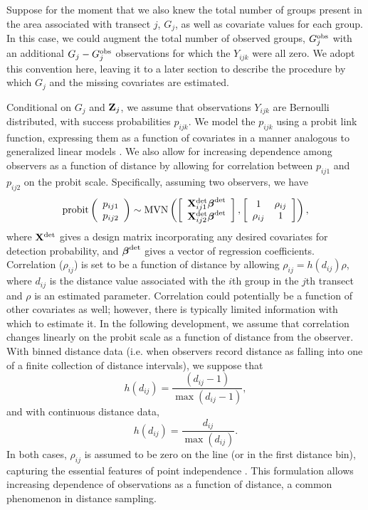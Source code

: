 \documentclass[10pt]{article}
\begin{document}
Suppose for the moment that we also knew the total number of groups present in the area associated with transect $j$, $G_j$, as well as covariate values for each group.  In this case, we could augment the total number of observed groups, $G_j^{\rm obs}$ with an additional $G_j-G_j^{\rm obs}$ observations for which the $Y_{ijk}$ were all zero.  We adopt this convention here, leaving it to a later section to describe the procedure by which $G_j$ and the missing covariates are estimated.

Conditional on $G_j$ and ${\bf Z}_j$, we assume that observations $Y_{ijk}$ are Bernoulli distributed, with success probabilities $p_{ijk}$.
We model the $p_{ijk}$ using a probit link function, expressing them as a function of covariates in a manner analogous to generalized linear models \cite{McCullaghNelder1989}.  We also allow for increasing dependence among observers as a function of distance by allowing for correlation between $p_{ij1}$ and $p_{ij2}$ on the probit scale. Specifically, assuming two observers, we have
$$
{\rm probit} \left(\begin{array}{c}
				p_{ij1} \\
				p_{ij2}
		\end{array}\right) \sim {\rm MVN}
\left( \left[ \begin{array}{c}
				{\bf X}_{ij1}^{\rm det} \boldsymbol{\beta}^{\rm det}\\
				{\bf X}_{ij2}^{\rm det} \boldsymbol{\beta}^{\rm det}
		\end{array}\right],
        \left[ \begin{array}{cc}
            1 & \rho_{ij} \\
            \rho_{ij} & 1
        \end{array} \right]
\right),
$$
where ${\bf X}^{\rm det}$ gives a design matrix incorporating any desired covariates for detection probability, and $\boldsymbol{\beta}^{\rm det}$ gives a vector of regression coefficients.  Correlation ($\rho_{ij}$) is set to be a function of distance by allowing $\rho_{ij} = h(d_{ij}) \rho$, where $d_{ij}$ is the distance value associated with the $i$th group in the $j$th transect and $\rho$ is an estimated parameter. Correlation could potentially be a function of other covariates as well; however, there is typically limited information with which to estimate it. In the following development, we assume that correlation changes linearly on the probit scale as a function of distance from the observer.  With binned distance data (i.e. when observers record distance as falling into one of a finite collection of distance intervals), we suppose that
$$
h(d_{ij})=\frac{(d_{ij}-1)}{\max(d_{ij}-1)},
$$
and with continuous distance data,
$$
h(d_{ij})=\frac{d_{ij}}{\max(d_{ij})}.
$$
In both cases, $\rho_{ij}$ is assumed to be zero on the line (or in the first distance bin), capturing the essential features of point independence \cite{LaakeBorchers2004,BorchersEtAl2006,BucklandEtAl2010}.  This formulation allows increasing dependence of observations as a function of distance, a common phenomenon in distance sampling.
\end{document}
